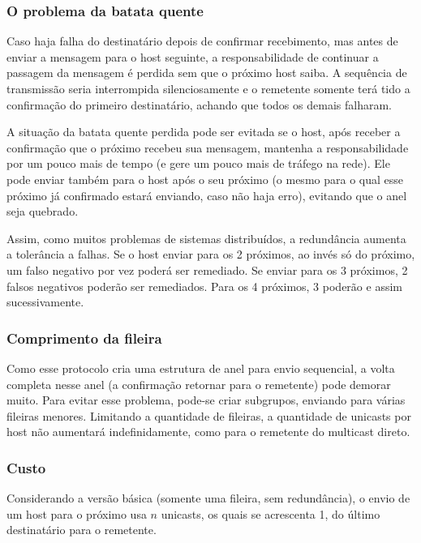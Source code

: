 \documentclass[12pt,twocolumn]{article}
\begin{document}
					\subsubsection*{O problema da batata quente}
						Caso haja falha do destinatário depois de confirmar recebimento, mas antes de enviar a mensagem para o host seguinte, a responsabilidade de continuar a passagem da mensagem é perdida sem que o próximo host saiba.
						A sequência de transmissão seria interrompida silenciosamente e o remetente somente terá tido a confirmação do primeiro destinatário, achando que todos os demais falharam.
						
						A situação da batata quente perdida pode ser evitada se o host, após receber a confirmação que o próximo recebeu sua mensagem, mantenha a responsabilidade por um pouco mais de tempo (e gere um pouco mais de tráfego na rede).
						Ele pode enviar também para o host após o seu próximo (o mesmo para o qual esse próximo já confirmado estará enviando, caso não haja erro), evitando que o anel seja quebrado.
						
						Assim, como muitos problemas de sistemas distribuídos, a redundância aumenta a tolerância a falhas.
						Se o host enviar para os 2 próximos, ao invés só do próximo, um falso negativo por vez poderá ser remediado.
						Se enviar para os 3 próximos, 2 falsos negativos poderão ser remediados.
						Para os 4 próximos, 3 poderão e assim sucessivamente.
						
					\subsubsection*{Comprimento da fileira}
					
						Como esse protocolo cria uma estrutura de anel para envio sequencial, a volta completa nesse anel (a confirmação retornar para o remetente) pode demorar muito.
						Para evitar esse problema, pode-se criar subgrupos, enviando para várias fileiras menores.
						Limitando a quantidade de fileiras, a quantidade de unicasts por host não aumentará indefinidamente, como para o remetente do multicast direto.	
				
				\subsubsection{Custo}
				
					Considerando a versão básica (somente uma fileira, sem redundância), o envio de um host para o próximo usa $n$ unicasts, os quais se acrescenta 1, do último destinatário para o remetente.					
				
\end{document}
